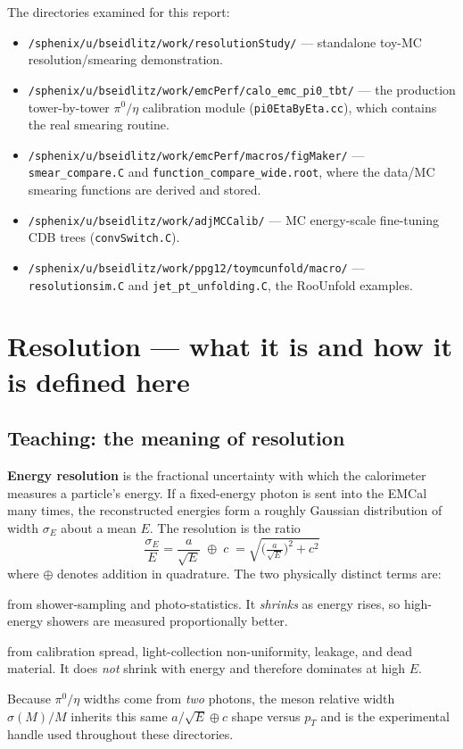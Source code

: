 \documentclass[11pt]{article}
\newcommand{\pp}[1]{\textcolor{pathcol}{\texttt{#1}}}
\begin{document}
The directories examined for this report:
\begin{itemize}[nosep]
  \item \pp{/sphenix/u/bseidlitz/work/resolutionStudy/} --- standalone toy-MC
        resolution/smearing demonstration.
  \item \pp{/sphenix/u/bseidlitz/work/emcPerf/calo\_emc\_pi0\_tbt/} --- the
        production tower-by-tower $\pi^0/\eta$ calibration module
        (\texttt{pi0EtaByEta.cc}), which contains the real smearing routine.
  \item \pp{/sphenix/u/bseidlitz/work/emcPerf/macros/figMaker/} ---
        \texttt{smear\_compare.C} and \texttt{function\_compare\_wide.root},
        where the data/MC smearing functions are derived and stored.
  \item \pp{/sphenix/u/bseidlitz/work/adjMCCalib/} --- MC energy-scale
        fine-tuning CDB trees (\texttt{convSwitch.C}).
  \item \pp{/sphenix/u/bseidlitz/work/ppg12/toymcunfold/macro/} ---
        \texttt{resolutionsim.C} and \texttt{jet\_pt\_unfolding.C}, the
        RooUnfold examples.
\end{itemize}

\section{Resolution --- what it is and how it is defined here}

\subsection{Teaching: the meaning of resolution}
\textbf{Energy resolution} is the fractional uncertainty with which the
calorimeter measures a particle's energy. If a fixed-energy photon is sent into
the EMCal many times, the reconstructed energies form a roughly Gaussian
distribution of width $\sigma_E$ about a mean $E$. The resolution is the ratio
\[
  \boxed{\;\frac{\sigma_E}{E}=\frac{a}{\sqrt{E}}\;\oplus\;c\;
          =\sqrt{\Big(\tfrac{a}{\sqrt{E}}\Big)^{2}+c^{2}}\;}
\]
where $\oplus$ denotes addition in quadrature. The two physically distinct
terms are:
\begin{description}[nosep]
  \item[Stochastic term $a/\sqrt{E}$:] from shower-sampling and
        photo-statistics. It \emph{shrinks} as energy rises, so high-energy
        showers are measured proportionally better.
  \item[Constant term $c$:] from calibration spread, light-collection
        non-uniformity, leakage, and dead material. It does \emph{not} shrink
        with energy and therefore dominates at high $E$.
\end{description}
Because $\pi^0/\eta$ widths come from \emph{two} photons, the meson relative
width $\sigma(M)/M$ inherits this same $a/\sqrt{E}\oplus c$ shape versus $p_T$
and is the experimental handle used throughout these directories.
\end{document}
